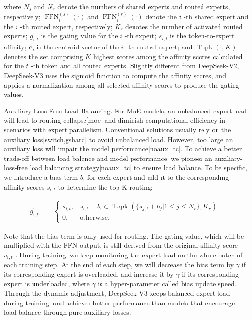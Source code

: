 \documentclass[11pt,a4paper]{article}
\begin{document}
where  $N_{s}$  and  $N_r$  denote the numbers of shared experts and routed experts, respectively;  $\operatorname{FFN}^{(s)}_{i}(\cdot)$  and  $\operatorname{FFN}^{(r)}_{i}(\cdot)$  denote the  $i$ -th shared expert and the  $i$ -th routed expert, respectively;  $K_{r}$  denotes the number of activated routed experts;  $g_{i,t}$  is the gating value for the  $i$ -th expert;  $s_{i,t}$  is the token-to-expert affinity;  $\mathbf{e}_{i}$  is the centroid vector of the  $i$ -th routed expert; and  $\operatorname{Topk}(\cdot, K)$  denotes the set comprising  $K$  highest scores among the affinity scores calculated for the  $t$ -th token and all routed experts. Slightly different from DeepSeek-V2, DeepSeek-V3 uses the sigmoid function to compute the affinity scores, and applies a normalization among all selected affinity scores to produce the gating values.

Auxiliary-Loss-Free Load Balancing. For MoE models, an unbalanced expert load will lead to routing collapse[moe] and diminish computational efficiency in scenarios with expert parallelism. Conventional solutions usually rely on the auxiliary loss[switch,gshard] to avoid unbalanced load. However, too large an auxiliary loss will impair the model performance[noaux\_tc]. To achieve a better trade-off between load balance and model performance, we pioneer an auxiliary-loss-free load balancing strategy[noaux\_tc] to ensure load balance. To be specific, we introduce a bias term  $b_i$  for each expert and add it to the corresponding affinity scores  $s_{i,t}$  to determine the top-K routing:

$$\begin{align}
    g^{\prime}_{i,t} & = \begin{cases} 
    s_{i,t}, & s_{i,t} + b_i \in \operatorname{Topk} (\{ s_{j, t} + b_j | 1 \leq j \leq N_r \}, K_{r}), \\
    0, & \text{otherwise}.
    \end{cases}
\end{align}$$

Note that the bias term is only used for routing. The gating value, which will be multiplied with the FFN output, is still derived from the original affinity score  $s_{i,t}$ . During training, we keep monitoring the expert load on the whole batch of each training step. At the end of each step, we will decrease the bias term by  $\gamma$  if its corresponding expert is overloaded, and increase it by  $\gamma$  if its corresponding expert is underloaded, where  $\gamma$  is a hyper-parameter called bias update speed. Through the dynamic adjustment, DeepSeek-V3 keeps balanced expert load during training, and achieves better performance than models that encourage load balance through pure auxiliary losses.
\end{document}
